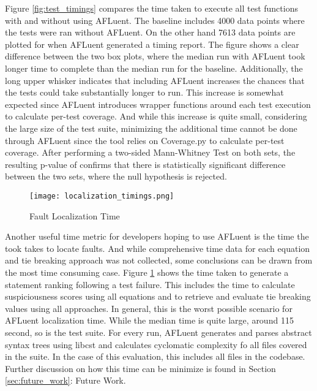 Figure \ref{fig:test_timings} compares the time taken to execute all test
functions with and without using AFLuent. The baseline includes
4000 data points where the tests were ran without AFLuent. On the other hand
7613 data points are plotted for when AFLuent generated a timing report. The
figure shows a clear difference between the two box plots, where the median run with
AFLuent took longer time to complete than the median run for the baseline.
Additionally, the long upper whisker indicates that
including AFLuent increases the chances that the tests could take substantially
longer to run. This increase is somewhat expected since AFLuent introduces
wrapper functions around each test execution to calculate per-test coverage. And
while this increase is quite small, considering the large size of the test suite,
minimizing the additional time cannot be done through AFLuent since the tool
relies on Coverage.py to calculate per-test coverage. After performing a two-sided
Mann-Whitney Test on both sets, the resulting p-value of
 confirms that there is statistically significant difference
between the two sets, where the null hypothesis is rejected.

\begin{figure}[!htb]
	\begin{center}
		\texttt{[image: localization\_timings.png]}
		\caption{\label{fig:localization_timings} Fault Localization Time}
	\end{center}
\end{figure}

Another useful time metric for developers hoping to use AFLuent is the time the
took takes to locate faults. And while
comprehensive time data for each equation and tie breaking approach was not
collected, some conclusions can be drawn from the most time consuming case.
Figure \ref{fig:localization_timings} shows the time taken to generate a
statement ranking following a test failure. This includes the time to calculate
suspiciousness scores using all equations and to retrieve and evaluate tie
breaking values using all approaches. In general, this is the worst possible
scenario for AFLuent localization time. While the median time is quite large,
around 115 second, so is the test suite. For every run, AFLuent generates and parses
abstract syntax trees using libcst and calculates cyclomatic complexity fo all
files covered in the suite. In the case of this evaluation, this includes all
files in the codebase. Further discussion on how this time can be minimize is
found in Section \ref{sec:future_work}: Future Work.

